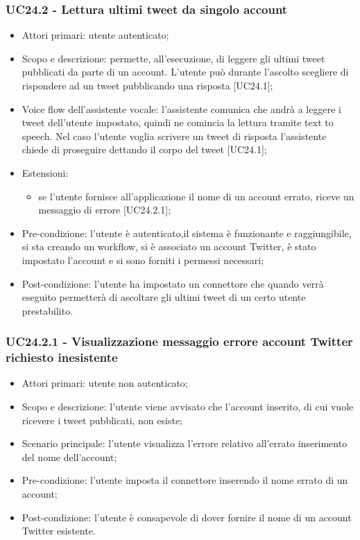 \subsubsection{UC24.2 - Lettura ultimi tweet da singolo account}
\begin{itemize}
	\item  Attori primari: utente autenticato;
	\item  Scopo e descrizione: permette, all'esecuzione, di leggere gli ultimi tweet pubblicati da parte di un account. L'utente può durante l'ascolto scegliere di rispondere ad un tweet pubblicando una risposta [UC24.1];
	\item  Voice flow dell'assistente vocale: l'assistente comunica che andrà a leggere i tweet dell'utente impostato, quindi ne comincia la lettura tramite text to speech. Nel caso l'utente voglia scrivere un tweet di risposta l'assistente chiede di proseguire dettando il corpo del tweet [UC24.1];
	\item  Estensioni: 
		   \begin{itemize}
				\item se l'utente fornisce all'applicazione il nome di un account errato, riceve un messaggio di errore [UC24.2.1];
		   \end{itemize}
	\item  Pre-condizione: l'utente è autenticato,il sistema è funzionante e raggiungibile, si sta creando un workflow, si è associato un account Twitter, è stato impostato l'account e si sono forniti i permessi necessari;
	\item  Post-condizione: l'utente ha impostato un connettore che quando verrà eseguito permetterà di ascoltare gli ultimi tweet di un certo utente prestabilito.
\end{itemize}
\subsubsection{UC24.2.1 - Visualizzazione messaggio errore account Twitter richiesto inesistente}
\begin{itemize}
	\item  Attori primari: utente non autenticato;
	\item  Scopo e descrizione: l'utente viene avvisato che l'account inserito, di cui vuole ricevere i tweet pubblicati, non esiste;
	\item  Scenario principale: l'utente visualizza l'errore relativo all'errato inserimento del nome dell'account;
	\item  Pre-condizione: l'utente imposta il connettore inserendo il nome errato di un account;
	\item  Post-condizione: l'utente è consapevole di dover fornire il nome di un account Twitter esistente.
\end{itemize}

